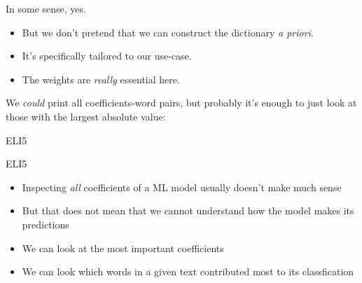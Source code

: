

\begin{frame}{In some sense, yes.}
	\begin{itemize}
		\item But we don't pretend that we can construct the dictionary \emph{a priori}.
		\item It's specifically tailored to our use-case.
		\item The weights are \emph{really} essential here.
	\end{itemize}
	
	\pause
	We \emph{could} print all coefficients-word pairs, but probably it's enough to just look at those with the largest absolute value:
\end{frame}



\begin{frame}{ELI5}
\end{frame}

\begin{frame}{ELI5}
	\begin{itemize}
		\item Inspecting \emph{all} coefficients of a ML model usually doesn't make much sense
		\item But that does not mean that we cannot understand how the model makes its predictions
		\item We can look at the most important coefficients
		\item We can look which words in a given text contributed most to its classfication
	\end{itemize}
\end{frame}




